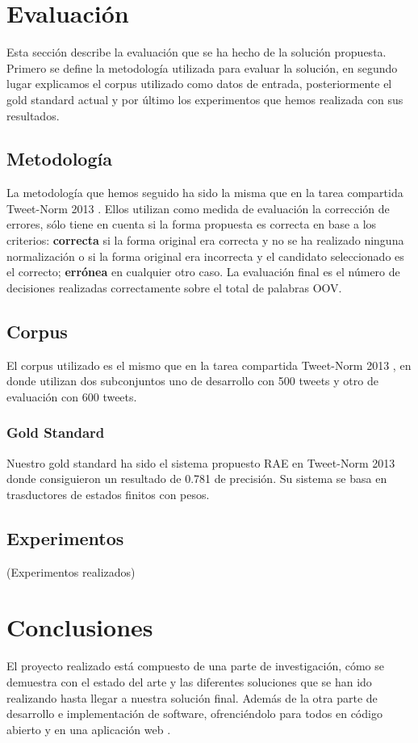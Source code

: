\documentclass[spanish,12pt, a4paper,twoside]{paper}
\let\oldsection\section
\def\section{\cleardoublepage\oldsection}
\begin{document}
\section{Evaluación}\label{sec:evaluacion}
Esta sección describe la evaluación que se ha hecho de la solución propuesta. Primero se define la metodología utilizada para evaluar la solución, en segundo lugar explicamos el corpus utilizado como datos de entrada, posteriormente el gold standard actual y por último los experimentos que hemos realizada con sus resultados.

\subsection{Metodología}\label{sec:metodologia}
La metodología que hemos seguido ha sido la misma que en la tarea compartida Tweet-Norm 2013 \cite{tweetnorm}. Ellos utilizan como medida de evaluación la corrección de errores, sólo tiene en cuenta si la forma propuesta es correcta en base a los criterios: \textbf{correcta} si la forma original era correcta y no se ha realizado ninguna normalización o si la forma original era incorrecta y el candidato seleccionado es el correcto; \textbf{errónea} en cualquier otro caso. La evaluación final es el número de decisiones realizadas correctamente sobre el total de palabras OOV.

\subsection{Corpus}\label{sec:corpus}
El corpus utilizado es el mismo que en la tarea compartida Tweet-Norm 2013 \cite{tweetnorm}, en donde utilizan dos subconjuntos uno de desarrollo con 500 tweets y otro de evaluación con 600 tweets.

\subsubsection{Gold Standard}\label{sec:goldstandard}
Nuestro gold standard ha sido el sistema propuesto RAE \cite{porta:2013} en Tweet-Norm 2013 \cite{tweetnorm} donde consiguieron un resultado de 0.781 de precisión. Su sistema se basa en trasductores de estados finitos con pesos. 

\subsection{Experimentos}\label{sec:experimentos}
(Experimentos realizados)

\section{Conclusiones}\label{sec:conclusiones}
El proyecto realizado está compuesto de una parte de investigación, cómo se demuestra con el estado del arte y las diferentes soluciones que se han ido realizando hasta llegar a nuestra solución final. Además de la otra parte de desarrollo e implementación de software, ofrenciéndolo para todos en código abierto y en una aplicación web \cite{tweetscweb}.\\
\end{document}

